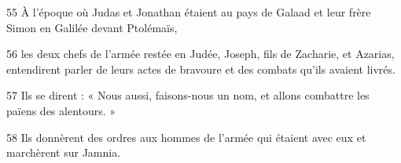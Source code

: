 55 À l’époque où Judas et Jonathan étaient au pays de Galaad et leur frère Simon en Galilée devant Ptolémaïs,

56 les deux chefs de l’armée restée en Judée, Joseph, fils de Zacharie, et Azarias, entendirent parler de leurs actes de bravoure et des combats qu’ils avaient livrés.

57 Ils se dirent : « Nous aussi, faisons-nous un nom, et allons combattre les païens des alentours. »

58 Ils donnèrent des ordres aux hommes de l’armée qui étaient avec eux et marchèrent sur Jamnia.

